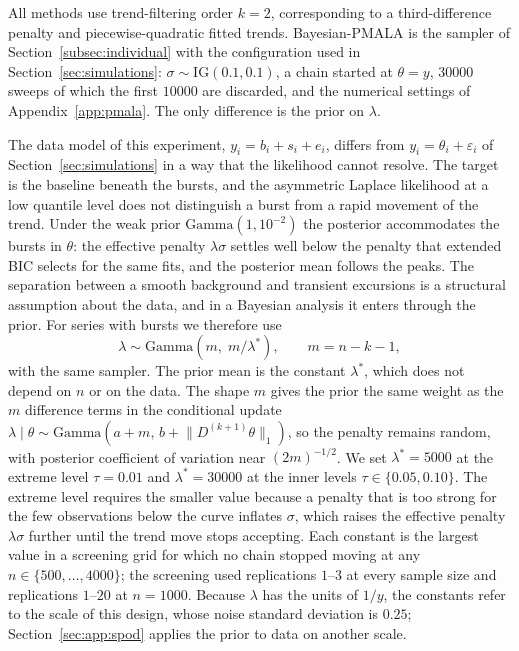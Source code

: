 All methods use trend-filtering order $k=2$, corresponding to a third-difference penalty and piecewise-quadratic fitted trends. Bayesian-PMALA is the sampler of Section~\ref{subsec:individual} with the configuration used in Section~\ref{sec:simulations}: $\sigma\sim\mathrm{IG}(0.1,0.1)$, a chain started at $\theta=y$, $30000$ sweeps of which the first $10000$ are discarded, and the numerical settings of Appendix~\ref{app:pmala}. The only difference is the prior on $\lambda$.

The data model of this experiment, $y_i=b_i+s_i+e_i$, differs from $y_i=\theta_i+\varepsilon_i$ of Section~\ref{sec:simulations} in a way that the likelihood cannot resolve. The target is the baseline beneath the bursts, and the asymmetric Laplace likelihood at a low quantile level does not distinguish a burst from a rapid movement of the trend. Under the weak prior $\mathrm{Gamma}(1,10^{-2})$ the posterior accommodates the bursts in $\theta$: the effective penalty $\lambda\sigma$ settles well below the penalty that extended BIC selects for the same fits, and the posterior mean follows the peaks. The separation between a smooth background and transient excursions is a structural assumption about the data, and in a Bayesian analysis it enters through the prior. For series with bursts we therefore use
\begin{equation}
  \lambda\sim\mathrm{Gamma}\!\left(m,\;m/\lambda^\ast\right),\qquad m=n-k-1,
  \label{eq:air_prior}
\end{equation}
with the same sampler. The prior mean is the constant $\lambda^\ast$, which does not depend on $n$ or on the data. The shape $m$ gives the prior the same weight as the $m$ difference terms in the conditional update $\lambda\mid\theta\sim\mathrm{Gamma}(a+m,\,b+\lVert D^{(k+1)}\theta\rVert_1)$, so the penalty remains random, with posterior coefficient of variation near $(2m)^{-1/2}$. We set $\lambda^\ast=5000$ at the extreme level $\tau=0.01$ and $\lambda^\ast=30000$ at the inner levels $\tau\in\{0.05,0.10\}$. The extreme level requires the smaller value because a penalty that is too strong for the few observations below the curve inflates $\sigma$, which raises the effective penalty $\lambda\sigma$ further until the trend move stops accepting. Each constant is the largest value in a screening grid for which no chain stopped moving at any $n\in\{500,\ldots,4000\}$; the screening used replications $1$--$3$ at every sample size and replications $1$--$20$ at $n=1000$. Because $\lambda$ has the units of $1/y$, the constants refer to the scale of this design, whose noise standard deviation is $0.25$; Section~\ref{sec:app:spod} applies the prior to data on another scale.

